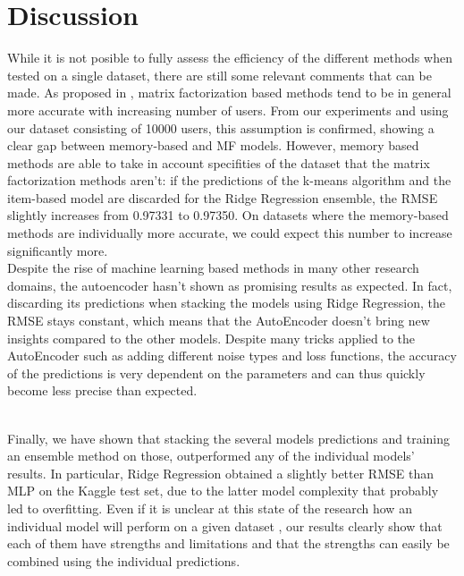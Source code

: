\documentclass[10pt,conference,compsocconf]{IEEEtran}
\begin{document}
\section{Discussion}
\label{disc}

While it is not posible to fully assess the efficiency of the different methods when tested on a single dataset, there are still some relevant comments that can be made. 
As proposed in \cite{comparative}, matrix factorization based methods tend to be in general more accurate with increasing number of users. From our experiments and using our dataset consisting of 10000 users, this assumption is confirmed, showing a clear gap between memory-based and MF models. However, memory based methods are able to take in account specifities of the dataset that the matrix factorization methods aren't: if the predictions of the k-means algorithm and the item-based model are discarded for the Ridge Regression ensemble, the RMSE slightly increases from 0.97331 to 0.97350. On datasets where the memory-based methods are individually more accurate, we could expect this number to increase significantly more.\\
Despite the rise of machine learning based methods in many other research domains, the autoencoder hasn't shown as promising results as expected. In fact, discarding its predictions when stacking the models using Ridge Regression, the RMSE stays constant, which means that the AutoEncoder doesn't bring new insights compared to the other models. Despite many tricks applied to the AutoEncoder such as adding different noise types and loss functions, the accuracy of the predictions is very dependent on the parameters and can thus quickly become less precise than expected. 

\\
Finally, we have shown that stacking the several models predictions and training an ensemble method on those, outperformed any of the individual models' results. 
In particular, Ridge Regression obtained a slightly better RMSE than MLP on the Kaggle test set, due to the latter model complexity that probably led to overfitting.
\iffalse
Even if it is unclear at this state of the research how an individual model will perform on a given dataset \cite{comparative}, our results clearly show that each of them have strengths and limitations and that the strengths can easily be combined using the individual predictions.
\end{document}
